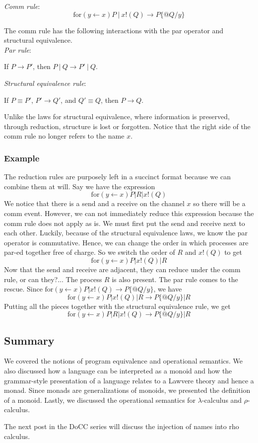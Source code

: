 \documentclass[12pt]{article}
\numberwithin{equation}{section}
\begin{document}
\noindent \emph{Comm rule}:
\[ \text{for}( y\leftarrow x )P \ | \ x!(Q) \rightarrow P \{ @Q/y \} \]

The comm rule has the following interactions with the par operator and structural equivalence. \\

\noindent \emph{Par rule}:
\begin{center}
If $P \rightarrow P'$, then $P \ | \ Q \rightarrow P' \ | \ Q.$
\end{center}

\noindent \emph{Structural equivalence rule}:
\begin{center}
If $P \equiv P'$, $ P' \rightarrow Q'$, and $Q' \equiv Q$, then $P \rightarrow Q.$
\end{center}

Unlike the laws for structural equivalence, where information is preserved, through reduction, structure is lost or forgotten. Notice that the right side of the comm rule no longer refers to the name $x$.

\subsubsection{Example}
The reduction rules are purposely left in a succinct format because we can combine them at will. Say we have the expression
\[ \text{for}(y \leftarrow x)P | R | x!(Q) \]
We notice that there is a send and a receive on the channel $x$ so there will be a comm event. However, we can not immediately reduce this expression because the comm rule does not apply as is. We must first put the send and receive next to each other. Luckily, because of the structural equivalence laws, we know the par operator is commutative. Hence, we can change the order in which processes are par-ed together free of charge. So we switch the order of $R$ and $x!(Q)$ to get
\[ \text{for}(y \leftarrow x)P | x!(Q) | R \]
Now that the send and receive are adjacent, they can reduce under the comm rule, or can they?... The process $R$ is also present. The par rule comes to the rescue. Since $\text{for}(y \leftarrow x)P | x!(Q) \rightarrow P\{ @Q/y \}$, we have
\[ \text{for}(y \leftarrow x)P | x!(Q) | R \rightarrow P\{ @Q/y \} | R \]
Putting all the pieces together with the structural equivalence rule, we get
\[ \text{for}(y \leftarrow x)P | R | x!(Q) \rightarrow P\{ @Q/y \} | R \]

\subsection{Summary}
We covered the notions of program equivalence and operational semantics. We also discussed how a language can be interpreted as a monoid and how the grammar-style presentation of a language relates to a Lawvere theory and hence a monad. Since monads are generalizations of monoids, we presented the definition of a monoid. Lastly, we discussed the operational semantics for $\lambda$-calculus and $\rho$-calculus.

The next post in the DoCC series will discuss the injection of names into rho calculus.


\end{document}
